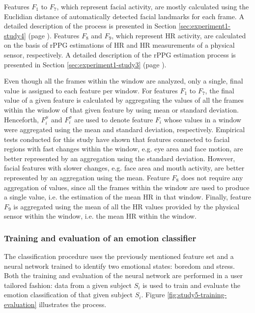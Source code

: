 Features $F_1$ to $F_7$, which represent facial activity, are mostly calculated using the Euclidian distance of automatically detected facial landmarks for each frame. A detailed description of the process is presented in Section \ref{sec:experiment1-study4} (page \pageref{sec:experiment1-study4}). Features $F_8$ and $F_9$, which represent HR activity, are calculated on the basis of rPPG estimations of HR and HR measurements of a physical sensor, respectively. A detailed description of the rPPG estimation process is presented in Section \ref{sec:experiment1-study3} (page \pageref{sec:experiment1-study3}).

Even though all the frames within the window are analyzed, only a single, final value is assigned to each feature per window. For features $F_1$ to $F_7$, the final value of a given feature is calculated by aggregating the values of all the frames within the window of that given feature by using mean or standard deviation. Henceforth, $F_i^\mu$ and $F_i^\sigma$ are used to denote feature $F_i$ whose values in a window were aggregated using the mean and standard deviation, respectively. Empirical tests conducted for this study have shown that features connected to facial regions with fast changes within the window, e.g. eye area and face motion, are better represented by an aggregation using the standard deviation. However, facial features with slower changes, e.g. face area and mouth activity, are better represented by an aggregation using the mean. Feature $F_8$ does not require any aggregation of values, since all the frames within the window are used to produce a single value, i.e. the estimation of the mean HR in that window. Finally, feature $F_9$ is aggregated using the mean of all the HR values provided by the physical sensor within the window, i.e. the mean HR within the window.

\subsubsection{Training and evaluation of an emotion classifier}
\label{sec:experiment1-study5-training-evaluation}

The classification procedure uses the previously mentioned feature set and a neural network trained to identify two emotional states: boredom and stress. Both the training and evaluation of the neural network are performed in a user tailored fashion: data from a given subject $S_i$ is used to train and evaluate the emotion classification of that given subject $S_i$. Figure \ref{fig:study5-training-evaluation} illustrates the process.

